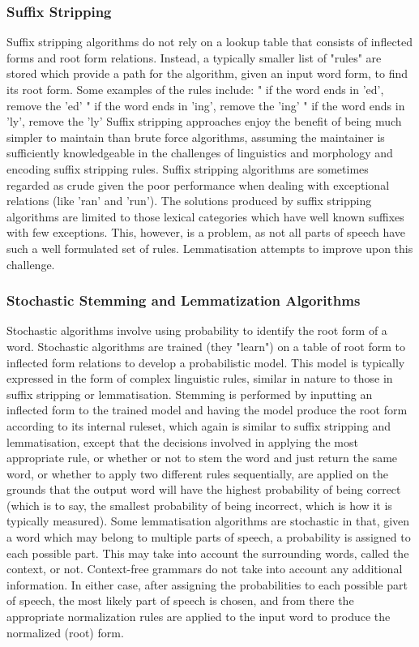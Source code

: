 \subsubsection{Suffix Stripping}
Suffix stripping algorithms do not rely on a lookup table that consists of inflected forms and root form relations. Instead, a typically smaller list of "rules" are stored which provide a path for the algorithm, given an input word form, to find its root form. Some examples of the rules include:
"	if the word ends in 'ed', remove the 'ed'
"	if the word ends in 'ing', remove the 'ing'
"	if the word ends in 'ly', remove the 'ly'
Suffix stripping approaches enjoy the benefit of being much simpler to maintain than brute force algorithms, assuming the maintainer is sufficiently knowledgeable in the challenges of linguistics and morphology and encoding suffix stripping rules. Suffix stripping algorithms are sometimes regarded as crude given the poor performance when dealing with exceptional relations (like 'ran' and 'run'). The solutions produced by suffix stripping algorithms are limited to those lexical categories which have well known suffixes with few exceptions. This, however, is a problem, as not all parts of speech have such a well formulated set of rules. Lemmatisation attempts to improve upon this challenge.

\subsubsection{Stochastic Stemming and Lemmatization Algorithms}
Stochastic algorithms involve using probability to identify the root form of a word. Stochastic algorithms are trained (they "learn") on a table of root form to inflected form relations to develop a probabilistic model. This model is typically expressed in the form of complex linguistic rules, similar in nature to those in suffix stripping or lemmatisation. Stemming is performed by inputting an inflected form to the trained model and having the model produce the root form according to its internal ruleset, which again is similar to suffix stripping and lemmatisation, except that the decisions involved in applying the most appropriate rule, or whether or not to stem the word and just return the same word, or whether to apply two different rules sequentially, are applied on the grounds that the output word will have the highest probability of being correct (which is to say, the smallest probability of being incorrect, which is how it is typically measured).
Some lemmatisation algorithms are stochastic in that, given a word which may belong to multiple parts of speech, a probability is assigned to each possible part. This may take into account the surrounding words, called the context, or not. Context-free grammars do not take into account any additional information. In either case, after assigning the probabilities to each possible part of speech, the most likely part of speech is chosen, and from there the appropriate normalization rules are applied to the input word to produce the normalized (root) form.

